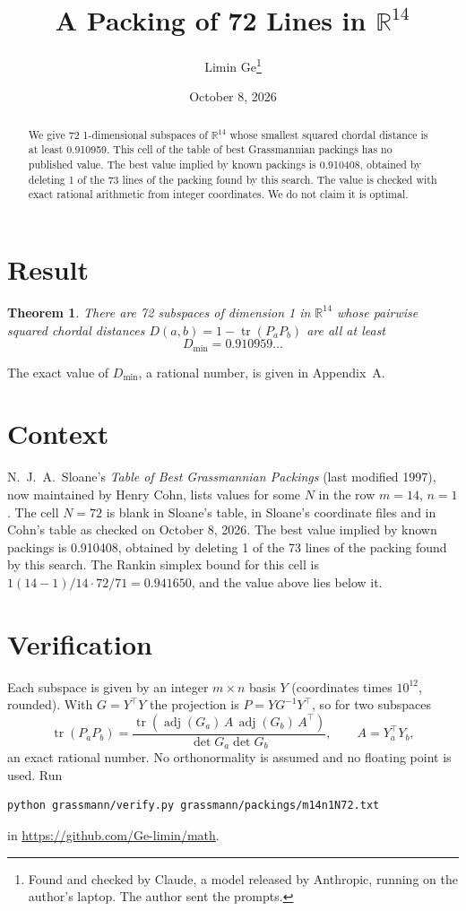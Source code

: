 \documentclass[11pt,a4paper]{article}
\title{A Packing of 72 Lines in $\mathbb{R}^{14}$}
\author{Limin Ge\thanks{Found and checked by Claude, a model released by Anthropic, running on the author's laptop. The author sent the prompts.}}
\date{October 8, 2026}
\newtheorem*{theorem}{Theorem}
\begin{document}
\maketitle
\begin{abstract}
We give 72 1-dimensional subspaces of $\mathbb{R}^{14}$ whose smallest squared chordal distance is at least 0.910959. This cell of the table of best Grassmannian packings has no published value. The best value implied by known packings is 0.910408, obtained by deleting 1 of the 73 lines of the packing found by this search. The value is checked with exact rational arithmetic from integer coordinates. We do not claim it is optimal.
\end{abstract}

\section{Result}
\begin{theorem}
There are 72 subspaces of dimension 1 in $\mathbb{R}^{14}$ whose pairwise squared chordal distances $D(a,b) = 1 - \operatorname{tr}(P_aP_b)$ are all at least
\[ D_{\min} = 0.910959\ldots \]
\end{theorem}
The exact value of $D_{\min}$, a rational number, is given in Appendix~A.


\section{Context}
N.~J.~A.~Sloane's \emph{Table of Best Grassmannian Packings} (last modified 1997), now maintained by Henry Cohn, lists values for some $N$ in the row $m=14$, $n=1$. The cell $N=72$ is blank in Sloane's table, in Sloane's coordinate files and in Cohn's table as checked on October 8, 2026. The best value implied by known packings is 0.910408, obtained by deleting 1 of the 73 lines of the packing found by this search. The Rankin simplex bound for this cell is $1(14-1)/14\cdot 72/71 = 0.941650$, and the value above lies below it.


\section{Verification}
Each subspace is given by an integer $m\times n$ basis $Y$ (coordinates times $10^{12}$, rounded). With $G=Y^\top Y$ the projection is $P=YG^{-1}Y^\top$, so for two subspaces
\[ \operatorname{tr}(P_aP_b)=\frac{\operatorname{tr}(\operatorname{adj}(G_a)\,A\,\operatorname{adj}(G_b)\,A^\top)}{\det G_a\det G_b},\qquad A=Y_a^\top Y_b, \]
an exact rational number. No orthonormality is assumed and no floating point is used. Run
\begin{verbatim}
python grassmann/verify.py grassmann/packings/m14n1N72.txt
\end{verbatim}
in \url{https://github.com/Ge-limin/math}.
\end{document}
